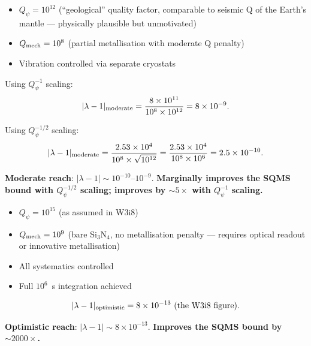 \documentclass[11pt]{article}
\newcommand{\lam}{\lambda}
\newcommand{\ee}[1]{\times 10^{#1}}
\newcommand{\Qpsi}{Q_\psi}
\newcommand{\Qmech}{Q_{\rm mech}}
\newcommand{\lbone}{|\lam - 1|}
\theoremstyle{definition}
\theoremstyle{remark}
\begin{document}
\begin{tcolorbox}[colback=yellow!3!white, colframe=yellow!60!black,
  title=\textbf{MODERATE (Balanced) Scenario}]
\begin{itemize}[nosep]
\item $\Qpsi = 10^{12}$ (``geological'' quality factor, comparable
  to seismic Q of the Earth's mantle --- physically plausible but
  unmotivated)
\item $\Qmech = 10^{8}$ (partial metallisation with moderate
  Q penalty)
\item Vibration controlled via separate cryostats
\end{itemize}

Using $\Qpsi^{-1}$ scaling:
\begin{equation}
\lbone_{\rm moderate} = \frac{8\ee{11}}{10^{8}\times 10^{12}}
= 8\ee{-9}.
\end{equation}

Using $\Qpsi^{-1/2}$ scaling:
\begin{equation}
\lbone_{\rm moderate} = \frac{2.53\ee{4}}{10^{8}\times\sqrt{10^{12}}}
= \frac{2.53\ee{4}}{10^{8}\times 10^{6}} = 2.5\ee{-10}.
\end{equation}

\textbf{Moderate reach}: $\lbone \sim 10^{-10}$--$10^{-9}$.
\textbf{Marginally improves the SQMS bound with $\Qpsi^{-1/2}$ scaling;
improves by $\sim 5\times$ with $\Qpsi^{-1}$ scaling.}
\end{tcolorbox}

\begin{tcolorbox}[colback=green!3!white, colframe=green!60!black,
  title=\textbf{OPTIMISTIC Scenario}]
\begin{itemize}[nosep]
\item $\Qpsi = 10^{15}$ (as assumed in W3i8)
\item $\Qmech = 10^{9}$ (bare Si$_3$N$_4$, no metallisation
  penalty --- requires optical readout or innovative metallisation)
\item All systematics controlled
\item Full $10^6$~s integration achieved
\end{itemize}

\begin{equation}
\lbone_{\rm optimistic} = 8\ee{-13}~\text{(the W3i8 figure)}.
\end{equation}

\textbf{Optimistic reach}: $\lbone \sim 8\ee{-13}$.
\textbf{Improves the SQMS bound by $\sim 2000\times$.}
\end{tcolorbox}
\end{document}
